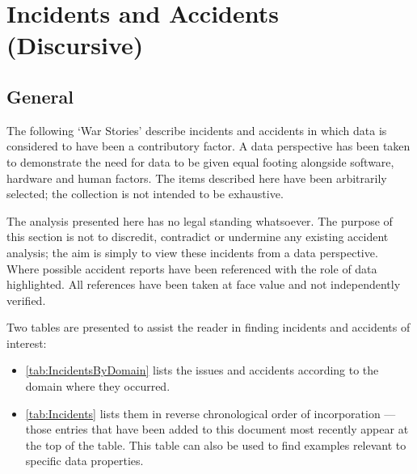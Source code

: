 %
%
\section{Incidents and Accidents (Discursive)} \label{bkm:accidents}


\subsection{General}
The following `War Stories' describe incidents and accidents in which data is considered to have been a contributory factor. A data perspective has been taken to demonstrate the need for data to be given equal footing alongside software, hardware and human factors. The items described here have been arbitrarily selected; the collection is not intended to be exhaustive.

 The analysis presented here has no legal standing whatsoever. The purpose of this section is not to discredit, contradict or undermine any existing accident analysis; the aim is simply to view these incidents from a data perspective. Where possible accident reports have been referenced with the role of data highlighted. All references have been taken at face value and not independently verified.

Two tables are presented to assist the reader in finding incidents and accidents of interest:
\begin{itemize}
\item \autoref{tab:IncidentsByDomain} lists the issues and accidents according to the domain where
  they occurred.
\item \autoref{tab:Incidents} lists them in reverse chronological order of incorporation --- those entries that have been added to this document most recently appear at the top of the table.
  This table can also be used to find examples relevant to specific data properties.
\end{itemize}

